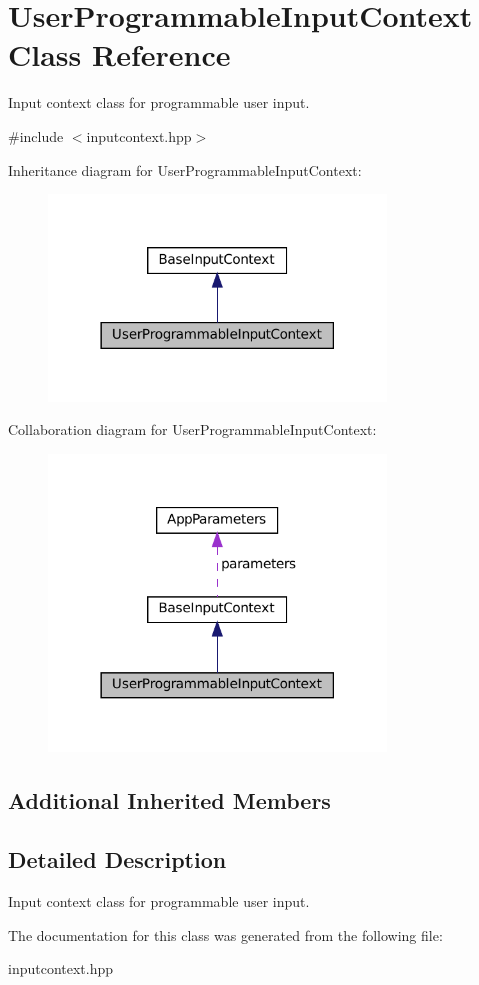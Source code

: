 \hypertarget{classUserProgrammableInputContext}{}\section{User\+Programmable\+Input\+Context Class Reference}
\label{classUserProgrammableInputContext}


Input context class for programmable user input.  




{\ttfamily \#include $<$inputcontext.\+hpp$>$}



Inheritance diagram for User\+Programmable\+Input\+Context\+:\nopagebreak
\begin{figure}[H]
\begin{center}
\leavevmode
\includegraphics[width=254pt]{classUserProgrammableInputContext__inherit__graph}
\end{center}
\end{figure}


Collaboration diagram for User\+Programmable\+Input\+Context\+:\nopagebreak
\begin{figure}[H]
\begin{center}
\leavevmode
\includegraphics[width=254pt]{classUserProgrammableInputContext__coll__graph}
\end{center}
\end{figure}
\subsection*{Additional Inherited Members}


\subsection{Detailed Description}
Input context class for programmable user input. 

The documentation for this class was generated from the following file\+:\begin{DoxyCompactItemize}
\item 
inputcontext.\+hpp\end{DoxyCompactItemize}
